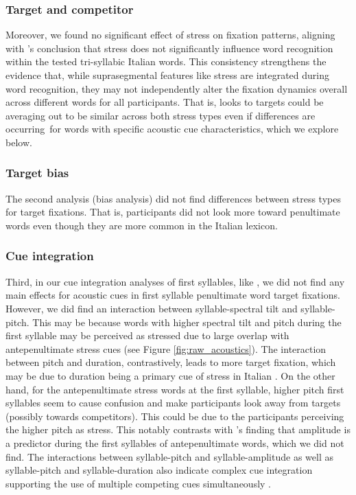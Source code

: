 \subsubsection{Target and competitor}

Moreover, we found no significant effect of stress on fixation patterns, aligning with \cite{Sulpizio_McQueen_2012}'s conclusion that stress does not significantly influence word recognition within the tested tri-syllabic Italian words. This consistency strengthens the evidence that, while suprasegmental features like stress are integrated during word recognition, they may not independently alter the fixation dynamics overall across different words for all participants. That is, looks to targets could be averaging out to be similar across both stress types even if differences are occurring\ for words with specific acoustic cue characteristics, which we explore below. 

\subsubsection{Target bias}

The second analysis (bias analysis) did not find differences between stress types for target fixations. That is, participants did not look more toward penultimate words even though they are more common in the Italian lexicon. 

\subsubsection{Cue integration}

Third, in our cue integration analyses of first syllables, like \cite{Sulpizio_McQueen_2012}, we did not find any main effects for acoustic cues in first syllable penultimate word target fixations. However, we did find an interaction between syllable-spectral tilt and syllable-pitch. This may be because words with higher spectral tilt and pitch during the first syllable may be perceived as stressed due to large overlap with antepenultimate stress cues (see Figure \ref{fig:raw_acoustics}). The interaction between pitch and duration, contrastively, leads to more target fixation, which may be due to duration being a primary cue of stress in Italian \cite{Alfano2006}. On the other hand, for the antepenultimate stress words at the first syllable, higher pitch first syllables seem to cause confusion and make participants look away from targets (possibly towards competitors). This could be due to the participants perceiving the higher pitch as stress. This notably contrasts with \cite{Sulpizio_McQueen_2012}'s finding that amplitude is a predictor during the first syllables of antepenultimate words, which we did not find. The interactions between syllable-pitch and syllable-amplitude as well as syllable-pitch and syllable-duration also indicate complex cue integration supporting the use of multiple competing cues simultaneously \citep{Kong2016}.

